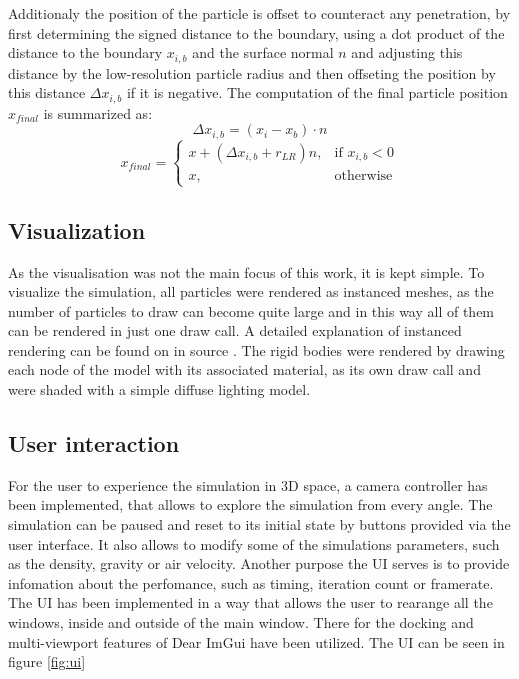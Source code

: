 \documentclass[intern]{cgMA}
\begin{document}
    Additionaly the position of the particle is offset to counteract any penetration, by first determining the signed distance to the boundary, using a dot product of the distance to the boundary $x_{i,b}$ and the surface normal $n$ and adjusting this distance by the low-resolution particle radius and then offseting the position by this distance $\Delta x_{i,b}$ if it is negative. The computation of the final particle position $x_{final}$ is summarized as:
    \begin{equation}
        \Delta x_{i,b} = (x_i - x_b) \cdot n
    \end{equation}
    \begin{equation}
        x_{final} = 
        \begin{cases}
            x + (\Delta x_{i,b} + r_{LR}) n,     & \text{if } x_{i,b} < 0 \\
            x,              & \text{otherwise}
        \end{cases}
    \end{equation}
    
    \subsection{Visualization}
    As the visualisation was not the main focus of this work, it is kept simple. To visualize the simulation, all particles were rendered as instanced meshes, as the number of particles to draw can become quite large and in this way all of them can be rendered in just one draw call. A detailed explanation of instanced rendering can be found on in source \cite{instancing}. The rigid bodies were rendered by drawing each node of the model with its associated material, as its own draw call and were shaded with a simple diffuse lighting model.

    \subsection{User interaction}
    For the user to experience the simulation in 3D space, a camera controller has been implemented, that allows to explore the simulation from every angle. The simulation can be paused and reset to its initial state by buttons provided via the user interface. It also allows to modify some of the simulations parameters, such as the density, gravity or air velocity. Another purpose the UI serves is to provide infomation about the perfomance, such as timing, iteration count or framerate. The UI has been implemented in a way that allows the user to rearange all the windows, inside and outside of the main window. There for the docking and multi-viewport features of Dear ImGui have been utilized. The UI can be seen in figure \ref{fig:ui}
\end{document}
